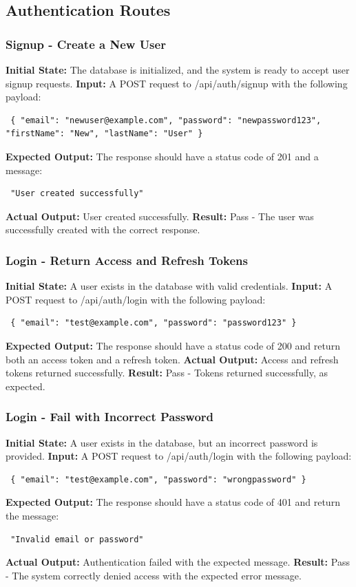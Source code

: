 \documentclass[12pt, titlepage]{article}
\begin{document}
\subsection{Authentication Routes} \subsubsection{Signup - Create a New User} \textbf{Initial State:} The database is initialized, and the system is ready to accept user signup requests.\newline
\textbf{Input:} A POST request to /api/auth/signup with the following payload:
\begin{verbatim} { "email": "newuser@example.com", "password": "newpassword123", "firstName": "New", "lastName": "User" } \end{verbatim}
\textbf{Expected Output:} The response should have a status code of 201 and a message:
\begin{verbatim} "User created successfully" \end{verbatim}
\textbf{Actual Output:} User created successfully.\newline
\textbf{Result:} Pass - The user was successfully created with the correct response.

\subsubsection{Login - Return Access and Refresh Tokens} \textbf{Initial State:} A user exists in the database with valid credentials.\newline
\textbf{Input:} A POST request to /api/auth/login with the following payload:
\begin{verbatim} { "email": "test@example.com", "password": "password123" } \end{verbatim}
\textbf{Expected Output:} The response should have a status code of 200 and return both an access token and a refresh token.\newline
\textbf{Actual Output:} Access and refresh tokens returned successfully.\newline
\textbf{Result:} Pass - Tokens returned successfully, as expected.

\subsubsection{Login - Fail with Incorrect Password} \textbf{Initial State:} A user exists in the database, but an incorrect password is provided.\newline
\textbf{Input:} A POST request to /api/auth/login with the following payload:
\begin{verbatim} { "email": "test@example.com", "password": "wrongpassword" } \end{verbatim}
\textbf{Expected Output:} The response should have a status code of 401 and return the message:
\begin{verbatim} "Invalid email or password" \end{verbatim}
\textbf{Actual Output:} Authentication failed with the expected message.\newline
\textbf{Result:} Pass - The system correctly denied access with the expected error message.
\end{document}
